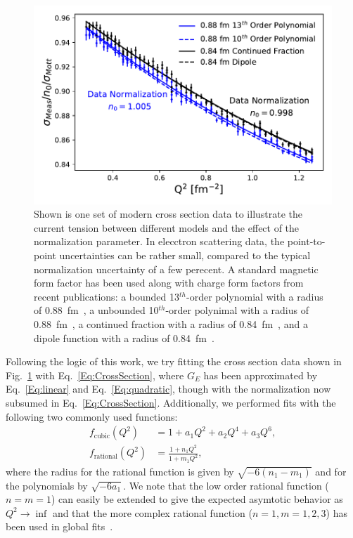\documentclass[10pt,aps,prc,twocolumn]{revtex4-1}
\begin{document}
\begin{figure}
\includegraphics[width=\columnwidth]{Figure/RealData.pdf} 
\caption{Shown is one set of modern cross section data to illustrate the current tension between 
different models and the effect of the normalization parameter.   In elecctron scattering data, the
point-to-point uncertainties can be rather small, compared to the typical normalization uncertainty
of a few perecent.   A standard magnetic
form factor has been used along with charge form factors from recent publications:  a bounded
13$^{th}$-order polynomial with a radius of 0.88~fm~\cite{Ye:2017gyb}, a unbounded 10$^{th}$-order polynimal with a radius of 0.88~fm~\cite{Bernauer:2013tpr}, 
a continued fraction with a radius of 0.84~fm~\cite{Griffioen:2015hta}, and a dipole function with a radius of 0.84~fm~\cite{Higinbotham:2015rja}. }
\label{RealData}
\end{figure}

Following the logic of this work, we try fitting the cross section data shown in Fig.~\ref{RealData} with  Eq.~\ref{Eq:CrossSection}, where
$G_E$ has been approximated by Eq.~\ref{Eq:linear} and Eq.~\ref{Eq:quadratic}, though with the normalization now subsumed in Eq.~\ref{Eq:CrossSection}.    
Additionally, we performed fits with the following two commonly used functions:
\begin{align}
f_{\mathrm{cubic}}(Q^2)   & = 1 + a_1 Q^2 + a_2 Q^4 + a_3 Q^6,  \\
f_{\mathrm{rational}}(Q^2) & = \frac{1+n_1 Q^2}{1+m_1 Q^2},
\end{align}
where the radius for the rational function is given by $\sqrt{-6 (n_1 - m_1)}$ and for the polynomials by $\sqrt{-6 a_1}$.
We note that the low order rational function ($n=m=1$) can easily be extended to give the expected asymtotic behavior
as $Q^2 \to \inf$ and that the more complex rational function ($n=1,m=1,2,3$) has been used in global fits~\cite{
Kelly:2004hm,
Puckett:2017flj,   
Gutsche:2017lyu}.
\end{document}
